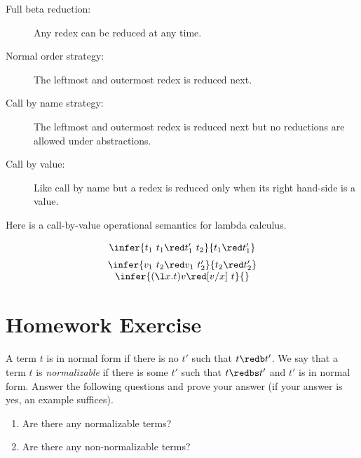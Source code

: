 \begin{description}
\item[Full beta reduction:] Any redex can be reduced at any time.
\item[Normal order strategy:] The leftmost and outermost redex is
  reduced next.
\item[Call by name strategy:] The leftmost and outermost redex is
  reduced next but no reductions are allowed under abstractions.
\item[Call by value:] Like call by name but a redex is reduced only
  when its right hand-side is a value.
\end{description}


Here is a call-by-value operational semantics for lambda calculus. 

\[
\begin{array}{c}
\infer{t_1~t_1 \red t_1'~t_2}{t_1 \red t_1'}\\[2mm]
\infer{v_1~t_2 \red v_1~t_2'}{t_2 \red t_2'}\\
\infer{(\l x.t) v \red [v/x]~t}{\strut}
\end{array}
\]

\section{Homework Exercise}
A term $t$ is in normal form if there is no $t'$ such that $t \redb
t'$.  We say that a term $t$ is \emph{normalizable} if there is some
$t'$ such that $t \redbs t'$ and $t'$ is in normal form.  Answer the
following questions and prove your answer (if your answer is yes, an
example suffices).

\begin{enumerate}
\item Are there any normalizable terms?
\item Are there any non-normalizable terms?
\end{enumerate}







